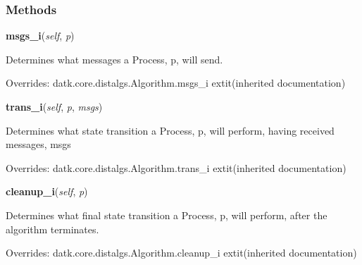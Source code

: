   \subsubsection{Methods}

    \vspace{0.5ex}

\hspace{.8\funcindent}\begin{boxedminipage}{\funcwidth}

    \raggedright \textbf{msgs\_i}(\textit{self}, \textit{p})

\setlength{\parskip}{2ex}
    Determines what messages a Process, p, will send.

\setlength{\parskip}{1ex}
      Overrides: datk.core.distalgs.Algorithm.msgs\_i 	extit{(inherited documentation)}

    \end{boxedminipage}

    \vspace{0.5ex}

\hspace{.8\funcindent}\begin{boxedminipage}{\funcwidth}

    \raggedright \textbf{trans\_i}(\textit{self}, \textit{p}, \textit{msgs})

\setlength{\parskip}{2ex}
    Determines what state transition a Process, p, will perform, having 
    received messages, msgs

\setlength{\parskip}{1ex}
      Overrides: datk.core.distalgs.Algorithm.trans\_i 	extit{(inherited documentation)}

    \end{boxedminipage}

    \vspace{0.5ex}

\hspace{.8\funcindent}\begin{boxedminipage}{\funcwidth}

    \raggedright \textbf{cleanup\_i}(\textit{self}, \textit{p})

\setlength{\parskip}{2ex}
    Determines what final state transition a Process, p, will perform, 
    after the algorithm terminates.

\setlength{\parskip}{1ex}
      Overrides: datk.core.distalgs.Algorithm.cleanup\_i 	extit{(inherited documentation)}

    \end{boxedminipage}


